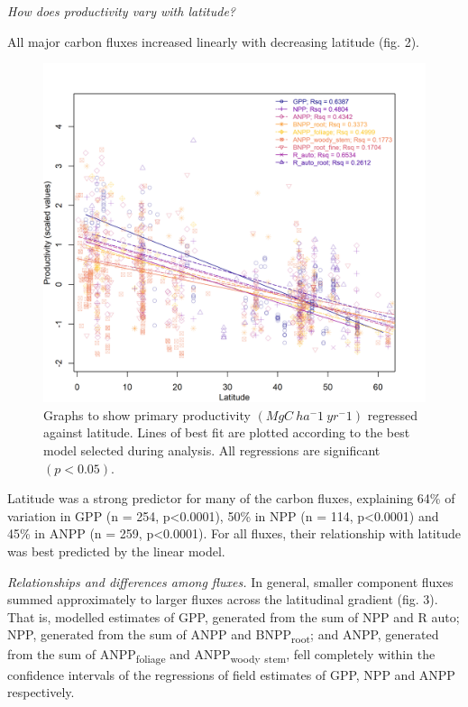 \documentclass[]{article}
\begin{document}
\emph{How does productivity vary with latitude?}

All major carbon fluxes increased linearly with decreasing latitude
(fig. 2).

\begin{figure}[H]
\includegraphics[width=1\linewidth]{effect_of_lat_transparent} \caption{Graphs to show primary productivity $(MgC~ha^-1~yr^-1)$ regressed against latitude. Lines of best fit are plotted according to the best model selected during analysis. All regressions are significant $(p<0.05)$.}\label{fig:unnamed-chunk-6}
\end{figure}

Latitude was a strong predictor for many of the carbon fluxes,
explaining 64\% of variation in GPP (n = 254, p\textless{}0.0001), 50\%
in NPP (n = 114, p\textless{}0.0001) and 45\% in ANPP (n = 259,
p\textless{}0.0001). For all fluxes, their relationship with latitude
was best predicted by the linear model.

\emph{Relationships and differences among fluxes.} In general, smaller
component fluxes summed approximately to larger fluxes across the
latitudinal gradient (fig. 3). That is, modelled estimates of GPP,
generated from the sum of NPP and R auto; NPP, generated from the sum of
ANPP and BNPP\textsubscript{root}; and ANPP, generated from the sum of
ANPP\textsubscript{foliage} and ANPP\textsubscript{woody}
\textsubscript{stem}, fell completely within the confidence intervals of
the regressions of field estimates of GPP, NPP and ANPP respectively.
\end{document}
